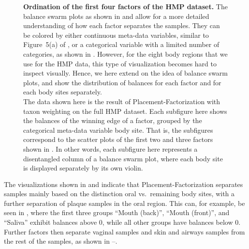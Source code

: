 \begin{figure}[!htpb]
    \caption[Ordination of the first four factors of the \acs{HMP} dataset]{
        \textbf{Ordination of the first four factors of the \ac{HMP} dataset.}
        The balance swarm plots as shown in
         and
        allow for a more detailed understanding of how each factor separates the samples.
        They can be colored by either continuous meta-data variables, similar to Figure~5(a) of ,
        or a categorical variable with a limited number of categories, as shown in .
        However, for the eight body regions that we use for the \ac{HMP} data,
        this type of visualization becomes hard to inspect visually.
        Hence, we here extend on the idea of balance swarm plots,
        and show the distribution of balances for each factor and for each body sites separately.
        \\
        The data shown here is the result of Placement-Factorization with taxon weighting on the full \ac{HMP} dataset.
        Each subfigure here shows the balances of the winning edge of a factor,
        grouped by the categorical meta-data variable body site.
        That is, the subfigures correspond to the scatter plots of the first two and three factors
        shown in .
        In other words, each subfigure here represents a disentangled column of a balance swarm plot,
        where each body site is displayed separately by its own violin. %
    }
    \label{fig:hmp_pf_all_violins}
\end{figure}

The visualizations shown in  and 
indicate that Placement-Factorization separates samples mainly based on the distinction oral vs.~remaining body sites,
with a further separation of plaque samples in the oral region.
This can, for example, be seen in ,
where the first three groups ``Mouth (back)'', ``Mouth (front)'', and ``Saliva'' exhibit balances above \num{0},
while all other groups have balances below \num{0}.
Further factors then separate vaginal samples and skin and airways samples from the rest of the samples,
as shown in --.

